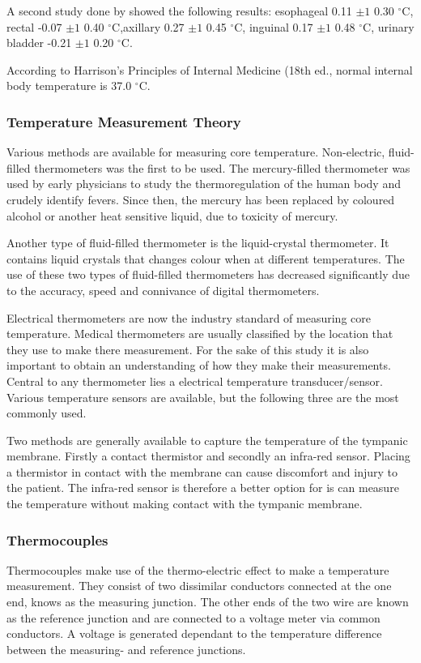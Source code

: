 A second study done by \cite{lefrant2003temperature} showed the following results: esophageal 0.11 $\pm 1$ 0.30 $^{\circ}$C, rectal -0.07 $\pm 1$ 0.40 $^{\circ}$C,axillary 0.27 $\pm 1$ 0.45 $^{\circ}$C, inguinal 0.17 $\pm 1$ 0.48 $^{\circ}$C, urinary bladder -0.21 $\pm 1$ 0.20 $^{\circ}$C.

According to Harrison's Principles of Internal Medicine (18th ed., normal internal body temperature is 37.0 $^{\circ}$C.



\subsubsection{Temperature Measurement Theory}
Various methods are available for measuring core temperature. Non-electric, fluid-filled thermometers was the first to be used. The mercury-filled thermometer was used by early physicians to study the thermoregulation of the human body and crudely identify fevers. Since then, the mercury has been replaced by coloured alcohol or another heat sensitive liquid, due to toxicity of mercury.

Another type of fluid-filled thermometer is the liquid-crystal thermometer. It contains liquid crystals that changes colour when at different temperatures. The use of these two types of fluid-filled thermometers has decreased significantly due to the accuracy, speed and connivance of digital thermometers.

Electrical thermometers are now the industry standard of measuring core temperature. Medical thermometers are usually classified by the location that they use to make there measurement. For the sake of this study it is also important to obtain an understanding of how they make their measurements. Central to any  thermometer lies a electrical temperature transducer/sensor. Various temperature sensors are available, but the following three are the most commonly used.

Two methods are generally available to capture the temperature of the tympanic membrane. Firstly a contact thermistor and secondly an infra-red sensor. Placing a thermistor in contact with the membrane can cause discomfort and injury to the patient. The infra-red sensor is therefore a better option for is can measure the temperature without making contact with the tympanic membrane.

\subsubsection{Thermocouples}
Thermocouples make use of the thermo-electric effect to make a temperature measurement. They consist of two dissimilar conductors connected at the one end, knows as the measuring junction. The other ends of the two wire are known as the reference junction and are connected to a voltage meter via common conductors. A voltage is generated dependant to the temperature difference between the measuring- and reference junctions.

